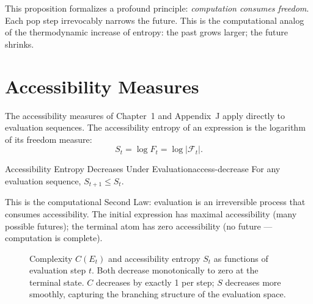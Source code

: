 This proposition formalizes a profound principle: \emph{computation
consumes freedom}. Each pop step irrevocably narrows the future.
This is the computational analog of the thermodynamic increase of
entropy: the past grows larger; the future shrinks.

\section{Accessibility Measures}

The accessibility measures of Chapter~1 and Appendix~J apply directly
to evaluation sequences. The accessibility entropy of an expression
is the logarithm of its freedom measure:
\[
  S_t = \log F_t = \log |\mathcal{F}_t|.
\]

\begin{proposition}{Accessibility Entropy Decreases Under Evaluation}{access-decrease}
  For any evaluation sequence, $S_{t+1} \leq S_t$.
\end{proposition}

This is the computational Second Law: evaluation is an irreversible
process that consumes accessibility. The initial expression has maximal
accessibility (many possible futures); the terminal atom has zero
accessibility (no future — computation is complete).

\begin{figure}[h]
  \centering
  \caption{Complexity $C(E_t)$ and accessibility entropy $S_t$ as
    functions of evaluation step $t$. Both decrease monotonically
    to zero at the terminal state. $C$ decreases by exactly 1 per
    step; $S$ decreases more smoothly, capturing the branching
    structure of the evaluation space.}
  \label{fig:entropy-decrease}
\end{figure}


